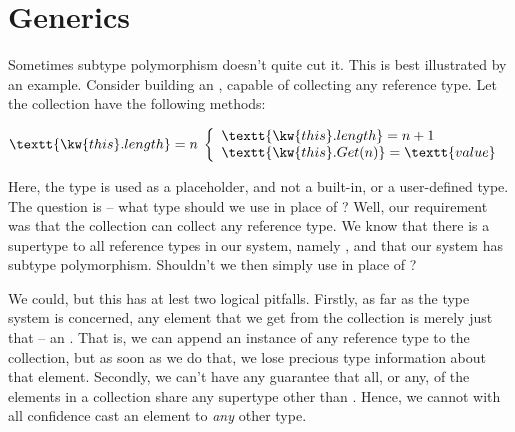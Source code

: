 \chapter{Generics}\label{chapter:generics}

%

Sometimes subtype polymorphism doesn't quite cut it. This is best illustrated
by an example. Consider building an , capable of
collecting any reference type. Let the collection have the following methods:

\begin{codebox}
\end{codebox}

\begin{codebox}
\zi {} $\textt{\kw{this}.length} = n$
\zi {} $\left\{
\begin{array}{l}
\textt{\kw{this}.length} = n + 1\\
\textt{\kw{this}.Get(n)} = \textt{value}
\end{array}
\right.$
\end{codebox}

\begin{codebox}
\end{codebox}

Here, the type  is used as a placeholder, and not a built-in, or a
user-defined type.  The question is -- what type should we use in place of
? Well, our requirement was that the collection can collect any
reference type. We know that there is a supertype to all reference types in our
system, namely , and that our system has subtype polymorphism.
Shouldn't we then simply use  in place of ?

We could, but this has at lest two logical pitfalls. Firstly, as far as the
type system is concerned, any element that we get from the collection is merely
just that -- an . That is, we can append an instance of any
reference type to the collection, but as soon as we do that, we lose precious
type information about that element. Secondly, we can't have any guarantee that
all, or any, of the elements in a collection share any supertype other than
.  Hence, we cannot with all confidence cast an element to
\emph{any} other type.

